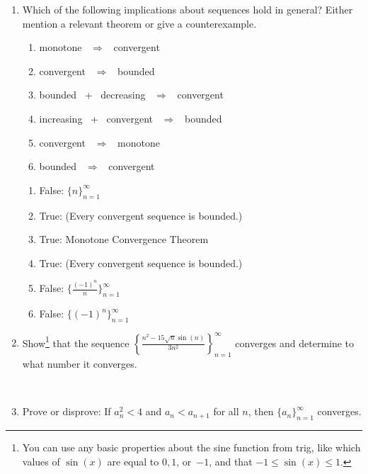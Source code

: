 \documentclass[12pt]{amsart}
\numberwithin{equation}{section}
\theoremstyle{plain} %
\theoremstyle{definition}
\theoremstyle{remark}
\begin{document}
\begin{enumerate}

\item Which of the following implications about sequences hold in general? Either mention a relevant theorem or give a counterexample.
	
\begin{multicols}{2}
\begin{enumerate}[label=(\alph*)]
\item monotone \ $\Longrightarrow$ \ convergent
\item convergent \ $\Longrightarrow$ \ bounded
\item bounded \ + \ decreasing  \ $\Longrightarrow$ \ convergent
\item increasing \ + \ convergent  \ $\Longrightarrow$ \ bounded
\item convergent  \ $\Longrightarrow$ \ monotone
\item bounded \ $\Longrightarrow$ \ convergent
\end{enumerate}
\end{multicols}

\begin{framed}
\begin{enumerate}[label=(\alph*)]
\item False: $\{ n\}_{n=1}^\infty$
\item True: (Every convergent sequence is bounded.)
\item True: Monotone Convergence Theorem
\item True: (Every convergent sequence is bounded.)
\item False: $\{ \frac{(-1)^n}{n}\}_{n=1}^\infty$
\item False: $\{ {(-1)^n}\}_{n=1}^\infty$
\end{enumerate}
\end{framed}

\item Show\footnote{You can use any basic properties about the sine function from trig, like which values of $\sin(x)$ are equal to $0,1$, or~$-1$, and that $-1 \leq \sin(x) \leq 1$.} that the sequence $\displaystyle \left\{ \frac{  n^2 -  15 \sqrt{n} \sin(n)  }{ 3n^2 } \right\}_{n=1}^\infty$ converges and determine to what number it converges.

\

\item Prove or disprove: If $a_n^2 < 4$ and $a_n < a_{n+1}$ for all $n$, then $\{a_n\}_{n=1}^\infty$ converges.


\end{enumerate}
\end{document}
